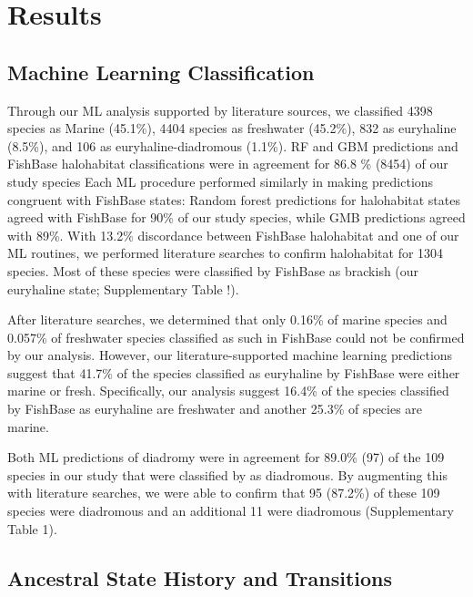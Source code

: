 \documentclass[11pt]{article}
\begin{document}
 
\section*{Results}


\subsection*{Machine Learning Classification}

Through our ML analysis supported by literature sources, we classified 4398 species as Marine (45.1\%), 4404 species as freshwater (45.2\%), 832 as euryhaline (8.5\%), and 106 as euryhaline-diadromous (1.1\%). RF and GBM predictions and FishBase halohabitat classifications were in agreement for 86.8 \% (8454) of our study species  Each ML procedure performed similarly in making predictions congruent with FishBase states: Random forest predictions for halohabitat states agreed with FishBase for 90\% of our study species, while GMB predictions agreed with 89\%.  With 13.2\% discordance between FishBase halohabitat and one of our ML routines, we performed literature searches to confirm halohabitat for 1304 species. 
Most of these species were classified by FishBase as brackish (our euryhaline state; Supplementary Table !). 

After literature searches, we determined that only 0.16\% of marine species and 0.057\% of freshwater species classified as such in FishBase could not be confirmed by our analysis. However, our literature-supported machine learning predictions suggest that 41.7\% of the species classified as euryhaline by FishBase were either marine or fresh.  Specifically, our analysis suggest 16.4\% of the species classified by FishBase as euryhaline are freshwater and another 25.3\% of species are marine. 

Both ML predictions of diadromy were in agreement for 89.0\% (97) of the 109  species in our study that were classified by \cite{corush2019evolutionary} as diadromous. By augmenting this with literature searches, we were able to confirm that 95 (87.2\%) of these 109 species were diadromous and an additional 11 were diadromous (Supplementary Table 1).


\subsection*{Ancestral State History and Transitions}
\end{document}
